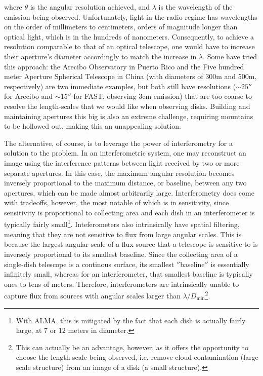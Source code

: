 \noindent where $\theta$ is the angular resolution achieved, and $\lambda$ is the wavelength of the emission being observed. Unfortunately, light in the radio regime has wavelengths on the order of millimeters to centimeters, orders of magnitude longer than optical light, which is in the hundreds of nanometers. Consequently, to achieve a resolution comparable to that of an optical telescope, one would have to increase their aperture's diameter accordingly to match the increase in $\lambda$. Some have tried this approach: the Arecibo Observatory in Puerto Rico and the Five hundred meter Aperture Spherical Telescope in China (with diameters of 300m and 500m, respectively) are two immediate examples, but both still have resolutions ($\sim25''$ for Arecibo and $\sim15''$ for FAST, observing 3cm emission) that are too coarse to resolve the length-scales that we would like when observing disks. Building and maintaining apertures this big is also an extreme challenge, requiring mountains to be hollowed out, making this an unappealing solution.



The alternative, of course, is to leverage the power of interferometry for a solution to the problem. In an interferometric system, one may reconstruct an image using the interference patterns between light received by two or more separate apertures. In this case, the maximum angular resolution becomes inversely proportional to the maximum distance, or baseline, between any two  apertures, which can be made almost arbitrarily large. Interferometry does come with tradeoffs, however, the most notable of which is in sensitivity, since sensitivity is proportional to collecting area and each dish in an interferometer is typically fairly small\footnote{With ALMA, this is mitigated by the fact that each dish is actually fairly large, at 7 or 12 meters in diameter.}. Inteferometers also intrinsically have spatial filtering, meaning that they are not sensitive to flux from large angular scales. This is because the largest angular scale of a flux source that a telescope is sensitive to is inversely proportional to its smallest baseline. Since the collecting area of a single-dish telescope is a continous surface, its smallest $''$baseline$''$ is essentially infinitely small, whereas for an interferometer, that smallest baseline is typically ones to tens of meters. Therefore, interferometers are intrinsically unable to capture flux from sources with angular scales larger than $\lambda/D_\text{min}$\footnote{This can actually be an advantage, however, as it offers the opportunity to choose the length-scale being observed, i.e. remove cloud contamination (large scale structure) from an image of a disk (a small structure).}.


